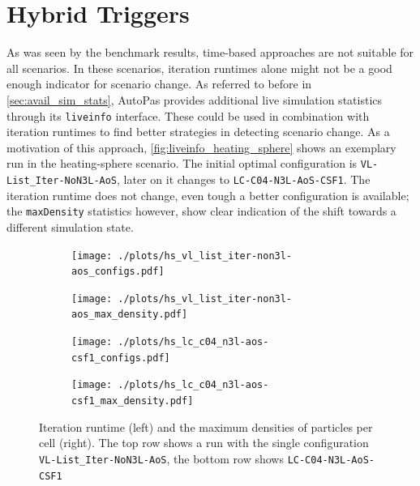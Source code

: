 
\section{Hybrid Triggers}
\label{sec:liveinfo_benchmarks}

As was seen by the benchmark results, time-based approaches are not suitable for all scenarios. In these scenarios, iteration runtimes alone might not be a good enough indicator for scenario change. As referred to before in \autoref{sec:avail_sim_stats}, AutoPas provides additional live simulation statistics through its \texttt{liveinfo} interface. These could be used in combination with iteration runtimes to find better strategies in detecting scenario change.
As a motivation of this approach, \autoref{fig:liveinfo_heating_sphere} shows an exemplary run in the heating-sphere scenario.
The initial optimal configuration is \texttt{VL-List\_Iter-NoN3L-AoS}, later on it changes to \texttt{LC-C04-N3L-AoS-CSF1}. \cite{Newcome2025}
The iteration runtime does not change, even tough a better configuration is available; the \texttt{maxDensity} statistics however, show clear indication of the shift towards a different simulation state.


\begin{figure}[htpb]
	\centering
	\begin{subfigure}{0.5\textwidth}
		\texttt{[image: ./plots/hs\_vl\_list\_iter-non3l-aos\_configs.pdf]}
	\end{subfigure}%
	\begin{subfigure}{0.5\textwidth}
		\texttt{[image: ./plots/hs\_vl\_list\_iter-non3l-aos\_max\_density.pdf]}
	\end{subfigure}
	\begin{subfigure}{0.5\textwidth}
		\texttt{[image: ./plots/hs\_lc\_c04\_n3l-aos-csf1\_configs.pdf]}
	\end{subfigure}%
	\begin{subfigure}{0.5\textwidth}
		\texttt{[image: ./plots/hs\_lc\_c04\_n3l-aos-csf1\_max\_density.pdf]}
	\end{subfigure}
	\caption{Iteration runtime (left) and the maximum densities of particles per cell (right). The top row shows a run with the single configuration \texttt{VL-List\_Iter-NoN3L-AoS}, the bottom row shows \texttt{LC-C04-N3L-AoS-CSF1}}
	\label{fig:liveinfo_heating_sphere}
\end{figure}





